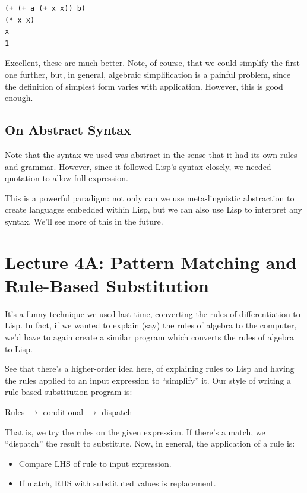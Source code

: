 \documentclass[9pt]{report}
\begin{document}
\begin{verbatim}
(+ (+ a (+ x x)) b)
(* x x)
x
1
\end{verbatim}


Excellent, these are much better. Note, of course, that we could
simplify the first one further, but, in general, algebraic
simplification is a painful problem, since the definition of
simplest form varies with application. However, this is good
enough.

\section{On Abstract Syntax}
\label{sec:org9853a7d}

Note that the syntax we used was abstract in the sense that it had
its own rules and grammar. However, since it followed Lisp's syntax
closely, we needed quotation to allow full expression.

This is a powerful paradigm: not only can we use meta-linguistic
abstraction to create languages embedded within Lisp, but we can
also use Lisp to interpret any syntax. We'll see more of this in
the future.

\chapter{Lecture 4A: Pattern Matching and Rule-Based Substitution}
\label{sec:orge4237d8}

It's a funny technique we used last time, converting the rules of
differentiation to Lisp. In fact, if we wanted to explain (say) the
rules of algebra to the computer, we'd have to again create a
similar program which converts the rules of algebra to Lisp.

See that there's a higher-order idea here, of explaining rules to
Lisp and having the rules applied to an input expression to
``simplify'' it. Our style of writing a rule-based substitution
program is:

Rules \(\rightarrow\) conditional \(\rightarrow\) dispatch

That is, we try the rules on the given expression. If there's a
match, we ``dispatch'' the result to substitute. Now, in general, the
application of a rule is:

\begin{itemize}
\item Compare LHS of rule to input expression.
\item If match, RHS with substituted values is replacement.
\end{itemize}
\end{document}
